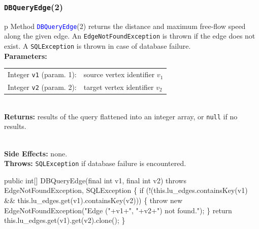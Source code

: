 \documentclass{article}
\def\nwendcode{\endtrivlist \endgroup}      %
\let\nwdocspar=\par
\theoremstyle{definition}                   %
\begin{document}
\subsubsection{{\tt{}\protect{}DBQueryEdge}(2)}
\begin{tabular}{p{\textwidth}}
\toprule
{}
Method \textcolor{blue}{{\tt{}\protect{}DBQueryEdge}}(2) returns the distance and
maximum free-flow speed along the given edge.
An {\tt{}EdgeNotFoundException} is thrown if the edge does not exist.
A {\tt{}SQLException} is thrown in case of database failure.\\
\midrule
\textbf{Parameters:} \\
\begin{tabular}{lp{116mm}}
Integer {\tt{}v1} (param. 1):&source vertex identifier $v_1$\\
Integer {\tt{}v2} (param. 2):&target vertex identifier $v_2$
\end{tabular}\\
\textbf{Returns:} results of the query flattened into an integer array, or
{\tt{}null} if no results.

\\
\textbf{Side Effects:} none.\\
\textbf{Throws:} {\tt{}SQLException} if database failure is encountered.\\
\bottomrule
\end{tabular}
\nwenddocs{}\endmoddef{}
public int[] DBQueryEdge(final int v1, final int v2)
throws EdgeNotFoundException, SQLException \{
  if (!(this.lu_edges.containsKey(v1) && this.lu_edges.get(v1).containsKey(v2))) \{
    throw new EdgeNotFoundException("Edge ("+v1+", "+v2+") not found.");
  \}
  return this.lu_edges.get(v1).get(v2).clone();
\}
\eatline
{}\nwendcode{}\nwdocspar
\end{document}
